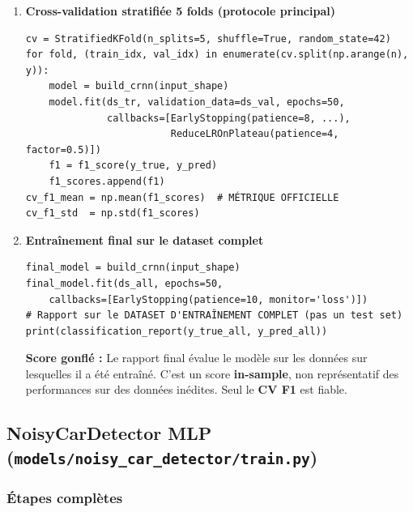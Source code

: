 \documentclass[11pt,a4paper]{article}
\newcommand{\file}[1]{\texttt{\small #1}}
\begin{document}
\begin{enumerate}[leftmargin=*, label=\textbf{\arabic{*}.}]
\item \textbf{Cross-validation stratifiée 5 folds (protocole principal)}
\begin{lstlisting}
cv = StratifiedKFold(n_splits=5, shuffle=True, random_state=42)
for fold, (train_idx, val_idx) in enumerate(cv.split(np.arange(n), y)):
    model = build_crnn(input_shape)
    model.fit(ds_tr, validation_data=ds_val, epochs=50,
              callbacks=[EarlyStopping(patience=8, ...),
                         ReduceLROnPlateau(patience=4, factor=0.5)])
    f1 = f1_score(y_true, y_pred)
    f1_scores.append(f1)
cv_f1_mean = np.mean(f1_scores)  # MÉTRIQUE OFFICIELLE
cv_f1_std  = np.std(f1_scores)
\end{lstlisting}

\item \textbf{Entraînement final sur le dataset complet}
\begin{lstlisting}
final_model = build_crnn(input_shape)
final_model.fit(ds_all, epochs=50,
    callbacks=[EarlyStopping(patience=10, monitor='loss')])
# Rapport sur le DATASET D'ENTRAÎNEMENT COMPLET (pas un test set)
print(classification_report(y_true_all, y_pred_all))
\end{lstlisting}
\begin{dangerbox}
\textbf{Score gonflé :} Le rapport final évalue le modèle sur les données
sur lesquelles il a été entraîné. C'est un score \textbf{in-sample}, non représentatif
des performances sur des données inédites. Seul le \textbf{CV F1} est fiable.
\end{dangerbox}

\end{enumerate}

\subsection{NoisyCarDetector MLP (\file{models/noisy\_car\_detector/train.py})}

\subsubsection{Étapes complètes}
\end{document}
